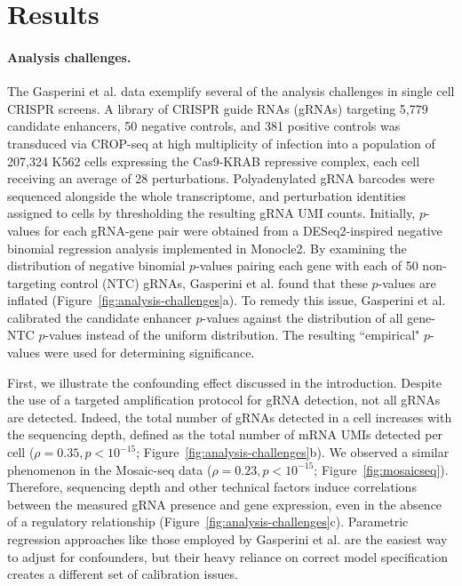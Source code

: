\documentclass{nature}
\begin{document}
\section*{Results}

\paragraph{Analysis challenges.} 

The Gasperini et al.\cite{Gasperini2019} data exemplify several of the analysis challenges in single cell CRISPR screens. A library of CRISPR guide RNAs (gRNAs) targeting 5,779 candidate enhancers, 50 negative controls, and 381 positive controls was transduced via CROP-seq\cite{Datlinger2017,Hill2018} at high multiplicity of infection into a population of 207,324 K562 cells expressing the Cas9-KRAB repressive complex, each cell receiving an average of 28 perturbations. Polyadenylated gRNA barcodes were sequenced alongside the whole transcriptome, and perturbation identities assigned to cells by thresholding the resulting gRNA UMI counts. Initially, $p$-values for each gRNA-gene pair were obtained from a DESeq2\cite{Love2014}-inspired negative binomial regression analysis implemented in Monocle2\cite{Qiu2017}. By examining the distribution of negative binomial $p$-values pairing each gene with each of 50 non-targeting control (NTC) gRNAs, Gasperini et al. found that these $p$-values are inflated (Figure~\ref{fig:analysis-challenges}a). To remedy this issue, Gasperini et al. calibrated the candidate enhancer $p$-values against the distribution of all gene-NTC $p$-values instead of the uniform distribution. The resulting ``empirical" $p$-values were used for determining significance. 

First, we illustrate the confounding effect discussed in the introduction. Despite the use of a targeted amplification protocol for gRNA detection\cite{Hill2018}, not all gRNAs are detected. Indeed, the total number of gRNAs detected in a cell increases with the sequencing depth, defined as the total number of mRNA UMIs detected per cell ($\rho = 0.35, p < 10^{-15}$; Figure~\ref{fig:analysis-challenges}b). We observed a similar phenomenon in the Mosaic-seq data\cite{Xie2017} ($\rho = 0.23, p < 10^{-15}$; Figure~\ref{fig:mosaicseq}). Therefore, sequencing depth and other technical factors induce correlations between the measured gRNA presence and gene expression, even in the absence of a regulatory relationship (Figure~\ref{fig:analysis-challenges}c). Parametric regression approaches like those employed by Gasperini et al. are the easiest way to adjust for confounders, but their heavy reliance on correct model specification creates a different set of calibration issues.
\end{document}
